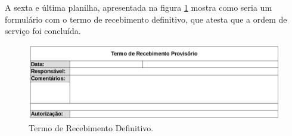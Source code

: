 A sexta e última planilha, apresentada na figura \ref{fig:prot_ack} mostra como
seria um formulário com o termo de recebimento definitivo, que atesta que a
ordem de serviço foi concluída.

\begin{figure}[H]
  \centering
  \includegraphics[keepaspectratio=true,scale=0.4]{figures/prot_ack}
  \caption{Termo de Recebimento Definitivo.}
  \label{fig:prot_ack}
\end{figure}
